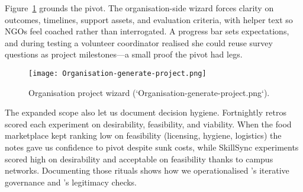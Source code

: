 Figure~\ref{fig:project-creation} grounds the pivot. The organisation-side wizard forces clarity on outcomes, timelines, support assets, and evaluation criteria, with helper text so NGOs feel coached rather than interrogated. A progress bar sets expectations, and during testing a volunteer coordinator realised she could reuse survey questions as project milestones---a small proof the pivot had legs.

\begin{figure}[h]
  \centering
  \texttt{[image: Organisation-generate-project.png]}
  \caption{Organisation project wizard (`Organisation-generate-project.png`).}
  \label{fig:project-creation}
\end{figure}

The expanded scope also let us document decision hygiene. Fortnightly retros scored each experiment on desirability, feasibility, and viability. When the food marketplace kept ranking low on feasibility (licensing, hygiene, logistics) the notes gave us confidence to pivot despite sunk costs, while SkillSync experiments scored high on desirability and acceptable on feasibility thanks to campus networks. Documenting those rituals shows how we operationalised \citet{Choudary2016}'s iterative governance and \citet{Srnicek2017}'s legitimacy checks.
